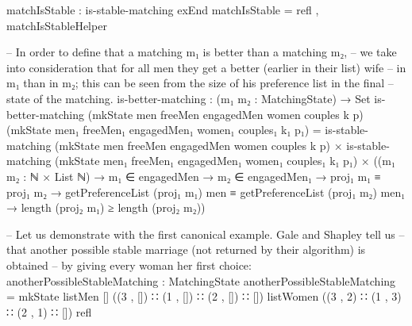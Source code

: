 \documentclass{article}
\begin{document}
\begin{code}
{matchIsStable : is-stable-matching exEnd
matchIsStable = refl , matchIsStableHelper

-- In order to define that a matching m₁ is better than a matching m₂,
-- we take into consideration that for all men they get a better (earlier in their list) wife
-- in m₁ than in m₂; this can be seen from the size of his preference list in the final
-- state of the matching. 
is-better-matching : (m₁ m₂ : MatchingState) → Set
is-better-matching (mkState men freeMen engagedMen women couples k p) (mkState men₁ freeMen₁ engagedMen₁ women₁ couples₁ k₁ p₁) =
  is-stable-matching (mkState men freeMen engagedMen women couples k p) × is-stable-matching (mkState men₁ freeMen₁ engagedMen₁ women₁ couples₁ k₁ p₁) ×
   ((m₁ m₂ : ℕ × List ℕ) → m₁ ∈ engagedMen →  m₂ ∈ engagedMen₁  → proj₁ m₁ ≡ proj₁ m₂ →
    getPreferenceList (proj₁ m₁) men ≡ getPreferenceList (proj₁ m₂) men₁ →
    length (proj₂ m₁) ≥ length (proj₂ m₂))


-- Let us demonstrate with the first canonical example. Gale and Shapley tell us
-- that another possible stable marriage (not returned by their algorithm) is obtained
-- by giving every woman her first choice:
anotherPossibleStableMatching : MatchingState
anotherPossibleStableMatching = mkState listMen [] ((3 , []) ∷ (1 , []) ∷ (2 , []) ∷ []) listWomen ((3 , 2) ∷ (1 , 3) ∷ (2 , 1) ∷ []) \AgdaUnderscore{} refl

}
\end{code}
\end{document}
